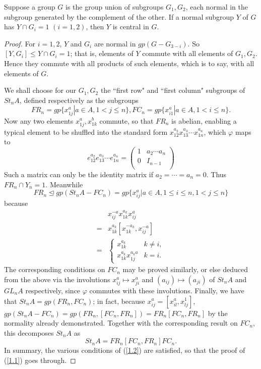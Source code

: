 \begin{lemma}\label{1.2}
Suppose a group $G$ is the group union of subgroups $G_1,G_2$, each normal in the subgroup generated by the complement of the other. If a normal subgroup $Y$ of $G$ has
$Y\cap G_i=1$ $(i=1,2)$, then $Y$ is central in $G$.

\end{lemma}
\begin{proof}
For $i=1,2$, $Y$ and $G_i$ are normal in $gp(G-G_{3-i})$. So $[Y,G_i]\leqslant Y\cap G_i=1$; that is, elements of $Y$ commute with all elements of $G_1,G_2$. Hence they commute with all products of such elements, which is to say, with all elements of $G$.

We shall choose for our $G_1,G_2$ the ``first row" and ``first column" subgroups of $St_nA$, defined respectively as the subgroups
\[FR_n=gp\{x^a_{1j}|a\in A, 1<j\leqslant n\},FC_n=gp\{x_{i1}^a|a\in A,1<i\leqslant n\}.\]
Now any two elements $x_{1j}^a,x_{1k}^b$ commute, so that $FR_n$ is abelian, enabling a typical element to be shuffled into the standard form $x_{12}^{a_2}x_{13}^{a_3}\cdots x_{1n}^{a_n}$, which $\varphi$ maps to
\[e_{12}^{a_2}e_{13}^{a_3}\cdots e_{1n}^{a_n}=\left(\begin{array}{c|c}
1& a_2\cdots a_n \\
\hline
0&I_{n-1}\\
\end{array}\right) \]
Such a matrix can only be the identity matrix if $a_2=\cdots=a_n=0$. Thus $FR_n\cap Y_n=1$. 
Meanwhile
\[FR_n\trianglelefteq gp(St_nA-FC_n)=gp\{x_{ij}^a|a\in A,1\leqslant i\leqslant n,1<j\leqslant n\}\]
because
\begin{equation*}
\begin{array}{rl}
&x_{ij}^{-a}x_{1k}^{a_k}x_{ij}^a\\
=& x_{1k}^{a_k}[x_{1k}^{-a_k},x_{ij}^{-a}]\\
=&\begin{cases}
x_{1k}^{a_k} &k\neq i,\\
x_{1k}^{a_k}x_{1j}^{a_ka} &k=i.
\end{cases}
\end{array}
\end{equation*}
The corresponding conditions on $FC_n$ may be proved similarly, or else deduced from the above via the involutions $x_{ij}^a\mapsto x_{ji}^a$ and $(a_{ij})\mapsto (a_{ji})$ of $St_nA$ and $GL_nA$ respectively, since $\varphi$ commutes with these involutions. Finally, we have that $St_nA=gp(FR_n,FC_n)$; in fact, because $x_{ij}^a=[x_{il}^a,x_{lj}^1]$, 
$gp(St_nA-FC_n)=gp(FR_n,[FC_n,FR_n])=FR_n[FC_n,FR_n]$ by the normality already demonstrated. Together with the corresponding result on $FC_n$, this decomposes $St_nA$ as
\[St_nA=FR_n[FC_n,FR_n]FC_n.\]
In summary, the various conditions of (\ref{1.2}) are satisfied, so that the proof of (\ref{1.1}) goes through.
\end{proof}
